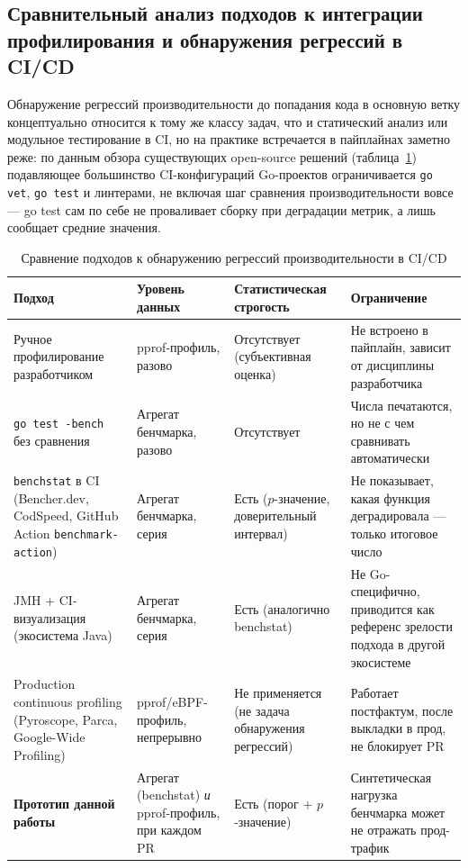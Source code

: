 \subsection{Сравнительный анализ подходов к интеграции профилирования и обнаружения регрессий в CI/CD}
\label{sec:1.2}

Обнаружение регрессий производительности до попадания кода в основную ветку
концептуально относится к тому же классу задач, что и статический анализ или
модульное тестирование в CI, но на практике встречается в пайплайнах заметно
реже: по данным обзора существующих open-source решений (таблица~\ref{tab:1.1})
подавляющее большинство CI-конфигураций Go-проектов ограничивается
\texttt{go vet}, \texttt{go test} и линтерами, не включая шаг сравнения
производительности вовсе — go test сам по себе не проваливает сборку при
деградации метрик, а лишь сообщает средние значения.

\begin{table}[htbp]
\caption{Сравнение подходов к обнаружению регрессий производительности в CI/CD}
\label{tab:1.1}
\centering
\begin{tabular}{p{2.6cm}p{3.6cm}p{3.6cm}p{4.2cm}}
\toprule
Подход & Уровень данных & Статистическая строгость & Ограничение \\
\midrule
Ручное профилирование разработчиком & pprof-профиль, разово & Отсутствует (субъективная оценка) & Не встроено в пайплайн, зависит от дисциплины разработчика \\
\texttt{go test -bench} без сравнения & Агрегат бенчмарка, разово & Отсутствует & Числа печатаются, но не с чем сравнивать автоматически \\
\texttt{benchstat} в CI (Bencher.dev, CodSpeed, GitHub Action \texttt{benchmark-action}) & Агрегат бенчмарка, серия & Есть ($p$-значение, доверительный интервал) & Не показывает, какая функция деградировала — только итоговое число \\
JMH + CI-визуализация (экосистема Java) & Агрегат бенчмарка, серия & Есть (аналогично benchstat) & Не Go-специфично, приводится как референс зрелости подхода в другой экосистеме \\
Production continuous profiling (Pyroscope, Parca, Google-Wide Profiling) & pprof/eBPF-профиль, непрерывно & Не применяется (не задача обнаружения регрессий) & Работает постфактум, после выкладки в прод, не блокирует PR \\
\textbf{Прототип данной работы} & Агрегат (benchstat) \emph{и} pprof-профиль, при каждом PR & Есть (порог + $p$-значение) & Синтетическая нагрузка бенчмарка может не отражать прод-трафик \\
\bottomrule
\end{tabular}
\end{table}

